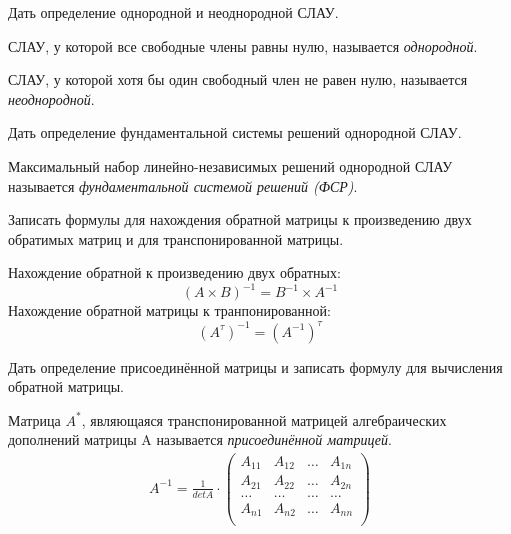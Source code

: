 \begin{question}
  Дать определение однородной и неоднородной СЛАУ.
\end{question} 
\begin{answer}
  СЛАУ, у которой все свободные члены равны нулю, называется \textit{однородной}.

  СЛАУ, у которой хотя бы один свободный член не равен нулю, называется \textit{неоднородной}.
\end{answer} 

\begin{question}
  Дать определение фундаментальной системы решений однородной СЛАУ.
\end{question} 
\begin{answer}
  Максимальный набор линейно-независимых решений однородной СЛАУ называется \textit{фундаментальной системой решений (ФСР)}.
\end{answer} 

\begin{question}
  Записать формулы для нахождения обратной матрицы к произведению двух обратимых матриц и для транспонированной матрицы.
\end{question} 
\begin{answer}
  Нахождение обратной к произведению двух обратных: \[
    \left( A \times B \right)^{-1} = B^{-1} \times A^{-1}
  \] 
  Нахождение обратной матрицы к транпонированной: \[
    \left( A^\tau \right)^{-1} = \left( A^{-1} \right)^\tau 
  \]
\end{answer}

\begin{question}
  Дать определение присоединённой матрицы и записать формулу для вычисления обратной матрицы.
\end{question} 
\begin{answer}
  Матрица $A^*$, являющаяся транспонированной матрицей алгебраических дополнений матрицы A называется  \textit{присоединённой матрицей}.
  \begin{gather*}
    A^{-1} = \frac{1}{det A} \cdot 
    \begin{pmatrix}
      A_{11} & A_{12} & \ldots & A_{1n} \\
      A_{21} & A_{22} & \ldots & A_{2n} \\
      \ldots & \ldots & \ldots & \ldots \\
      A_{n1} & A_{n2} & \ldots & A_{nn} \\
    \end{pmatrix}
  \end{gather*}
\end{answer} 

